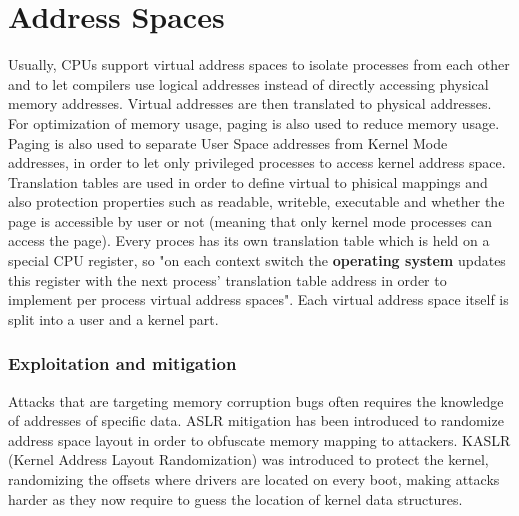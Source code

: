 \section{Address Spaces}
Usually, CPUs support virtual address spaces to isolate processes from each other and to let
compilers use logical addresses instead of directly accessing physical memory addresses. Virtual addresses
are then translated to physical addresses. For optimization of memory usage, paging is also used
to reduce memory usage. Paging is also used to separate User Space addresses from Kernel Mode addresses,
in order to let only privileged processes to access kernel address space. Translation tables are used in order to define virtual to phisical mappings
and also protection properties such as readable, writeble, executable and whether the page is accessible by
user or not (meaning that only kernel mode processes can access the page).
Every proces has its own translation table which is held on a special CPU register, so "on each context switch the \textbf{operating system} updates
this register with the next process' translation table address in order to implement per process virtual address spaces".
Each virtual address space itself is split into a user and a kernel part.
\subsubsection{Exploitation and mitigation}
Attacks that are targeting memory corruption bugs often requires the knowledge of addresses of specific data.
ASLR mitigation has been introduced to randomize address space layout in order to obfuscate memory mapping to
attackers. KASLR (Kernel Address Layout Randomization) was introduced to protect the kernel, randomizing the offsets where
drivers are located on every boot, making attacks harder as they now require to guess the location of kernel data structures.
